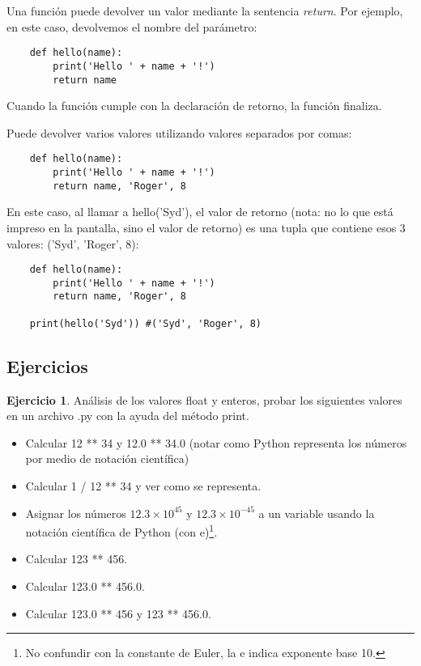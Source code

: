 \documentclass[12pt]{article}
\theoremstyle{definition}
\newtheorem{exercise}{Ejercicio}[section]
\begin{document}
    Una función puede devolver un valor mediante la sentencia \textit{return}.
    Por ejemplo, en este caso, devolvemos el nombre del parámetro:
    \begin{lstlisting}
    def hello(name):
        print('Hello ' + name + '!')
        return name
    \end{lstlisting}
    Cuando la función cumple con la declaración de retorno, la función finaliza.

    Puede devolver varios valores utilizando valores separados por comas:
    \begin{lstlisting}
    def hello(name):
        print('Hello ' + name + '!')
        return name, 'Roger', 8
    \end{lstlisting}

    En este caso, al llamar a hello('Syd'), el valor de retorno (nota: no lo que está impreso en la pantalla,
    sino el valor de retorno) es una tupla que contiene esos 3 valores: ('Syd', 'Roger', 8):

    \begin{lstlisting}
    def hello(name):
        print('Hello ' + name + '!')
        return name, 'Roger', 8

    print(hello('Syd')) #('Syd', 'Roger', 8)
    \end{lstlisting}


    \subsection{Ejercicios}

    \begin{exercise}
        Análisis de los valores float y enteros, probar los siguientes valores en un archivo .py con la ayuda del método print.
        \begin{itemize}
            \item Calcular 12 ** 34 y 12.0 ** 34.0 (notar como Python representa los números por medio de notación científica)
            \item Calcular 1 / 12 ** 34 y ver como se representa.
            \item Asignar los números $12.3\times 10^{45}$ y $12.3\times 10^{-45}$ a un variable usando la notación científica de Python (con e)\footnote{No confundir con la constante de Euler, la e indica exponente base 10.}.
            \item Calcular 123 ** 456.
            \item Calcular 123.0 ** 456.0.
            \item Calcular 123.0 ** 456 y 123 ** 456.0.
        \end{itemize}
    \end{exercise}
\end{document}
